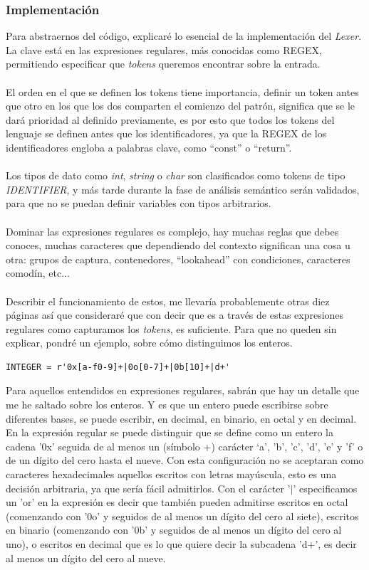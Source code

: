 \subsubsection{Implementación}
Para abstraernos del código, explicaré lo esencial de la implementación del \textit{Lexer}. La clave está en las expresiones regulares, más conocidas como REGEX, permitiendo especificar que \textit{tokens} queremos encontrar sobre la entrada.\\\\
\noindent El orden en el que se definen los tokens tiene importancia, definir un token antes que otro en los que los dos comparten el comienzo del patrón, significa que se le dará prioridad al definido previamente, es por esto que todos los tokens del lenguaje se definen antes que los identificadores, ya que la REGEX de los identificadores engloba a palabras clave, como ``const'' o ``return''.\\\\
Los tipos de dato como \textit{int}, \textit{string} o \textit{char} son clasificados como tokens de tipo \textit{IDENTIFIER}, y más tarde durante la fase de análisis semántico serán validados, para que no se puedan definir variables con tipos arbitrarios.\\\\
Dominar las expresiones regulares es complejo, hay muchas reglas que debes conoces, muchas caracteres que dependiendo del contexto significan una cosa u otra: grupos de captura, contenedores, ``lookahead'' con condiciones, caracteres comodín, etc... \\\\
Describir el funcionamiento de estos, me llevaría probablemente otras diez páginas así que consideraré que con decir que es a través de estas expresiones regulares como capturamos los \textit{tokens}, es suficiente. Para que no queden sin explicar, pondré un ejemplo, sobre cómo distinguimos los enteros.
\begin{lstlisting}[style=pythonStyle]
INTEGER = r'0x[a-f0-9]+|0o[0-7]+|0b[10]+|d+'
\end{lstlisting}
\noindent Para aquellos entendidos en expresiones regulares, sabrán que hay un detalle que me he saltado sobre los enteros. Y es que un entero puede escribirse sobre diferentes bases, se puede escribir, en decimal, en binario, en octal y en decimal.
En la expresión regular se puede distinguir que se define como un entero la cadena '0x' seguida de al menos un (símbolo +) carácter `a', 'b', 'c', 'd', 'e' y 'f' o de un dígito del cero hasta el nueve. Con esta configuración no se aceptaran como caracteres hexadecimales aquellos escritos con letras mayúscula, esto es una decisión arbitraria, ya que sería fácil admitirlos. Con el carácter '$|$' especificamos un 'or' en la expresión es decir que también pueden admitirse escritos en octal (comenzando con '0o' y seguidos de al menos un dígito del cero al siete), escritos en binario (comenzando con '0b' y seguidos de al menos un dígito del cero al uno), o escritos en decimal que es lo que quiere decir la subcadena 'd+', es decir al menos un dígito del cero al nueve. \\\\
